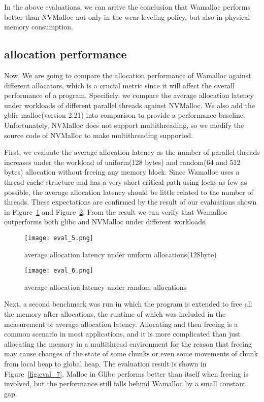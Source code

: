 \documentclass[10pt, conference, compsocconf]{IEEEtran}
\begin{document}
In the above evaluations, we can arrive the conclusion that
Wamalloc performs better than NVMalloc not only in the wear-leveling policy,
but also in physical memory consumption.

\subsection{allocation performance}

Now, We are going to compare the allocation performance of Wamalloc against different allocators,
which is a crucial metric since it will affect the overall performance of a program.
Specificly, we compare the average allocation latency under workloads of different parallel threads against NVMalloc.
We also add the gblic malloc(version 2.21) into comparison to provide a performance baseline.
Unfortunately, NVMalloc does not support multithreading,
so we modify the source code of NVMalloc to make multithreading supported.

First, we evaluate the average allocation latency as the number of parallel threads increases
under the workload of uniform(128 bytes) and random(64 and 512 bytes) allocation without freeing any memory block.
Since Wamalloc uses a thread-cache structure and has a very short critical path using locks as few as possible,
the average allocation latency should be little related to the number of threads.
These expectations are confirmed by the result of our evaluations shown in Figure~\ref{fig:eval_5} and Figure~\ref{fig:eval_6}.
From the result we can verify that Wamalloc outperforms both glibc and NVMalloc under different workloads.


\begin{figure}[t]
\centering
\texttt{[image: eval\_5.png]}
\caption{average allocation latency under uniform allocations(128byte)}
\label{fig:eval_5}
\end{figure}

\begin{figure}[t]
\centering
\texttt{[image: eval\_6.png]}
\caption{average allocation latency under random allocations}
\label{fig:eval_6}
\end{figure}

Next, a second benchmark was run in which the program is extended to free all the memory after allocations, 
the runtime of which was included in the measurement of average allocation latency.
Allocating and then freeing is a common scenario in most applications, 
and  it is more complicated than just allocating the memory in a multithread environment 
for the reason that freeing may cause changes of the state of some chunks or even some movements of chunk from local heap to global heap.
The evaluation result is shown in Figure~\ref{fig:eval_7}.
Malloc in Glibc performs better than itself when freeing is involved, 
but the performance still falls behind Wamalloc by a small constant gap.
\end{document}
